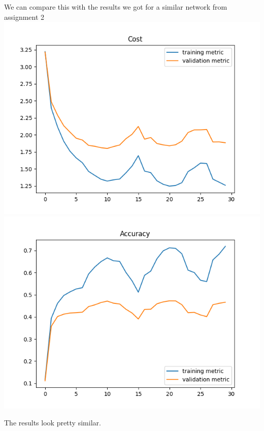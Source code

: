 \documentclass[11pt,a4paper]{article}
\begin{document}
We can compare this with the results we got for a similar network from assignment 2\\
\includegraphics[width=\textwidth]{ns=800_cost.png}
\includegraphics[width=\textwidth]{ns=800_accuracy.png}

The results look pretty similar.\\
\end{document}
